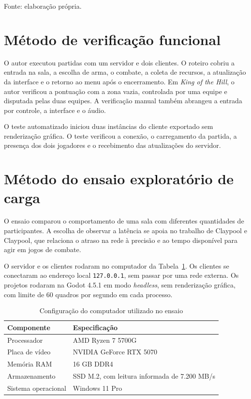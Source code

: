 Fonte: elaboração própria.

\section{Método de verificação funcional}\label{sec:4.7}

O autor executou partidas com um servidor e dois clientes. O roteiro cobriu a entrada na sala, a escolha de arma, o combate, a coleta de recursos, a atualização da interface e o retorno ao menu após o encerramento. Em \textit{King of the Hill}, o autor verificou a pontuação com a zona vazia, controlada por uma equipe e disputada pelas duas equipes. A verificação manual também abrangeu a entrada por controle, a interface e o áudio.

O teste automatizado iniciou duas instâncias do cliente exportado sem renderização gráfica. O teste verificou a conexão, o carregamento da partida, a presença dos dois jogadores e o recebimento das atualizações do servidor.

\section{Método do ensaio exploratório de carga}\label{sec:ensaio-carga-metodo}

O ensaio comparou o comportamento de uma sala com diferentes quantidades de participantes. A escolha de observar a latência se apoia no trabalho de Claypool e Claypool, que relaciona o atraso na rede à precisão e ao tempo disponível para agir em jogos de combate. \cite{CLAYPOOL-LATENCIA-2010}

O servidor e os clientes rodaram no computador da Tabela~\ref{tab:computador-ensaio}. Os clientes se conectaram ao endereço local \texttt{127.0.0.1}, sem passar por uma rede externa. Os projetos rodaram na Godot 4.5.1 em modo \textit{headless}, sem renderização gráfica, com limite de 60 quadros por segundo em cada processo.

\begin{table}[htbp]
\centering
\caption{Configuração do computador utilizado no ensaio}
\label{tab:computador-ensaio}
\begingroup
\small
\renewcommand{\arraystretch}{1.18}
\begin{tabular}{lp{}}
\toprule
Componente & Especificação \\
\midrule
Processador & AMD Ryzen 7 5700G \\
Placa de vídeo & NVIDIA GeForce RTX 5070 \\
Memória RAM & 16 GB DDR4 \\
Armazenamento & SSD M.2, com leitura informada de 7.200 MB/s \\
Sistema operacional & Windows 11 Pro \\
\bottomrule
\end{tabular}
\endgroup
{}
\end{table}


